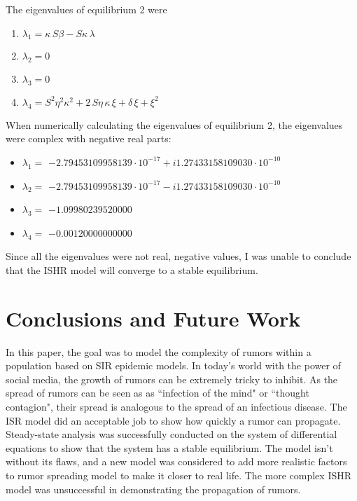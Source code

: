 \documentclass[11pt]{article}
\begin{document}
The eigenvalues of equilibrium 2 were 
\begin{enumerate}
\item $\lambda_1 = \kappa\,S\beta-S\kappa\,\lambda$
\item $\lambda_2 = 0$
\item $\lambda_3 = 0$
\item $\lambda_4 = {S}^{2}{\eta}^{2}{\kappa}^{2}+2\,S\eta\,\kappa\,\xi+\delta\,\xi+{\xi}^
{2}$
\end{enumerate}
 When numerically calculating the eigenvalues of equilibrium 2, the eigenvalues were complex with negative real parts:
\begin{itemize}
\item $\lambda_1 =$ $-2.79453109958139\cdot 10^{-17} + i 1.27433158109030\cdot 10^{-10}$
\item $\lambda_2 =$ $-2.79453109958139\cdot 10^{-17} - i 1.27433158109030\cdot 10^{-10}$
\item $\lambda_3 =$ $-1.09980239520000$
\item $\lambda_4 =$ $-0.00120000000000$
\end{itemize}  
Since all the eigenvalues were not real, negative values, I was unable to conclude that the ISHR model will converge to a stable equilibrium. 



\section{Conclusions and Future Work}
In this paper, the goal was to model the complexity of rumors within a population based on SIR epidemic models. In today's world with the power of social media, the growth of rumors can be extremely tricky to inhibit. As the spread of rumors can be seen as as ``infection of the mind" or ``thought contagion", their spread is analogous to the spread of an infectious disease. The ISR model did an acceptable job to show how quickly a rumor can propagate. Steady-state analysis was successfully conducted on the system of differential equations to show that the system has a stable equilibrium. The model isn't without its flaws, and a new model was considered to add more realistic factors to rumor spreading model to make it closer to real life. The more complex ISHR model was unsuccessful in demonstrating the propagation of rumors.
\end{document}
